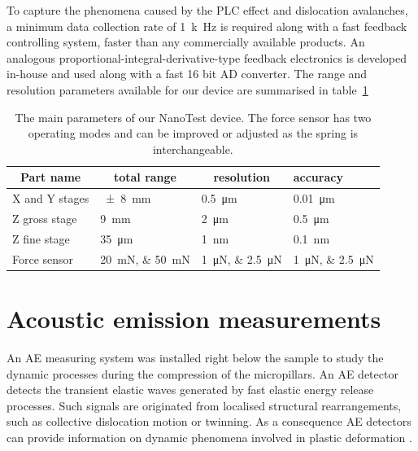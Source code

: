 To capture the phenomena caused by the PLC effect and dislocation avalanches, a minimum data collection rate of \SI{1}{k\hertz} is required along with a fast feedback controlling system, faster than any commercially available products. An analogous proportional-integral-derivative-type feedback electronics is developed in-house and used along with a fast 16 bit AD converter. The range and resolution parameters available for our device are summarised in table~\ref{table:nanotest_paramters}

\begin{table}[htbp]
\centering
\caption[NanoTest parameters]{The main parameters of our NanoTest device. The force sensor has two operating modes and can be improved or adjusted as the spring is interchangeable.}
\label{table:nanotest_paramters}
\begin{tabular}{llll}
\hline
\multicolumn{1}{c}{Part name} & \multicolumn{1}{c}{total range} & \multicolumn{1}{c}{resolution} & accuracy \\ \hline
X and Y stages  & \SI{\pm8}{mm}         & \SI{0.5}{\micro\meter} & \SI{0.01}{\micro\meter} \\
Z gross stage   & \SI{9}{mm}            & \SI{2}{\micro\meter}   & \SI{0.5}{\micro\meter}  \\
Z fine stage    & \SI{35}{\micro\meter} & \SI{1}{\nano\meter}    & \SI{0.1}{\nano\meter}   \\
Force sensor    & \SIlist{20;50}{mN}   & \SIlist{1;2.5}{\micro\newton} & \SIlist{1;2.5}{\micro\newton}   \\ \hline
\end{tabular}
\end{table}

\section{Acoustic emission measurements}
An AE measuring system was installed right below the sample to study the dynamic processes during the compression of the micropillars. An AE detector detects the transient elastic waves generated by fast elastic energy release processes. Such signals are originated from localised structural rearrangements, such as collective dislocation motion or twinning. As a consequence AE detectors can provide information on dynamic phenomena involved in plastic deformation \cite{heiple1987acoustic}.

